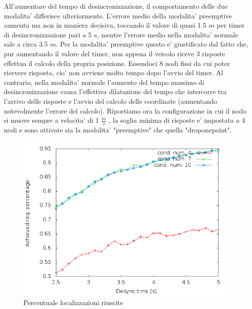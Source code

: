All'aumentare del tempo di desincronizzazione, il comportamento delle due modalita' differisce ulteriormente. L'errore medio della modalita' preemptive aumenta ma non in maniera decisiva, toccando il valore di quasi 1.5 $m$ per timer di desincronizzazione pari a 5 $s$, mentre l'errore medio nella modalita' normale sale a circa 3.5 $m$. Per la modalita' preemptive questo e' giustificato dal fatto che, pur aumentando il valore del timer, non appena il veicolo riceve 3 risposte effettua il calcolo della propria posizione. Essendoci 8 nodi fissi da cui poter ricevere risposta, cio' non avviene molto tempo dopo l'avvio del timer. Al contrario, nella modalita' normale l'aumento del tempo massimo di desincronizzazione causa l'effettiva dilatazione del tempo che intercorre tra l'arrivo delle risposte e l'avvio del calcolo delle coordinate (aumentando notevolmente l'errore del calcolo).
Riportiamo ora la configurazione in cui il nodo si muove sempre a velocita' di 1 $\frac{m}{s}$ , la soglia minima di risposte e' impostata a 4 nodi e sono attivate sia la modalita' "preemptive" che quella "droponepoint". 
\begin{figure}[H]
    \centering
    \includegraphics[scale=0.5]{octagonsimulation/achievedlocreq4preempt1drop1speed1.png}
    \caption{Percentuale localizzazioni riuscite}
    \label{fig:octagonsimulation/achievedlocreq4preempt1drop1speed1}
\end{figure}
